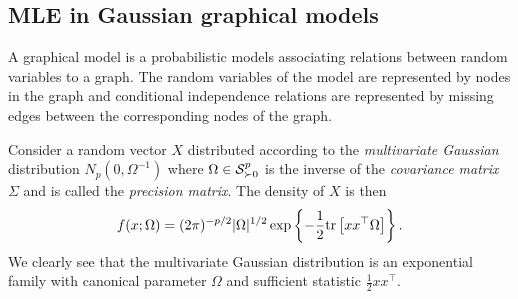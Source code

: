 \subsection{MLE in Gaussian graphical models}

A graphical model is a probabilistic models associating relations between random variables to a graph. The random variables of the model are represented by nodes in the graph and conditional independence relations are represented by missing edges between the corresponding nodes of the graph.

Consider a random vector $X$ distributed according to the \textit{multivariate Gaussian} distribution $N_p(0, \Omega^{-1})$ where $\Omega \in \S^p_{\succ 0}$ is the inverse of the \textit{covariance matrix} $\Sigma$ and is called the \textit{precision matrix}. The density of $X$ is then
\begin{equation} \label{eq-density-gaussian}
    f(x; \Omega) = (2\pi)^{-p/2} |\Omega|^{1/2} \expfc{-\frac{1}{2} \trB{xx^\top \Omega} }.
\end{equation}
We clearly see that the multivariate Gaussian distribution is an exponential family with canonical parameter $\Omega$ and sufficient statistic $\frac{1}{2}xx^\top$. 

